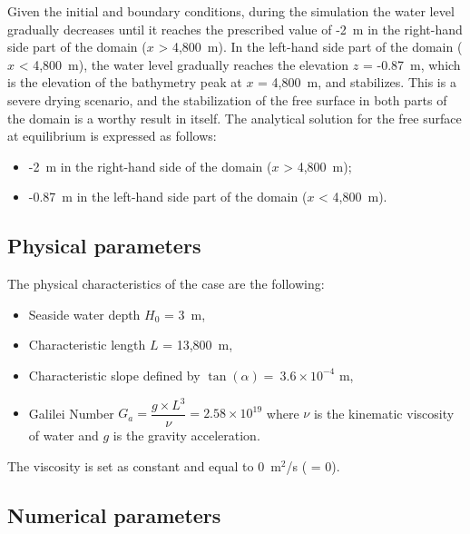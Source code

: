 Given the initial and boundary conditions, during the simulation
the water level gradually decreases until it reaches the prescribed value of -2~m in the right-hand
side part of the domain ($x$ > 4,800~m). In the left-hand side
part of the domain ($x$ < 4,800~m), the water level gradually reaches the elevation $z$ = -0.87~m, which
is the elevation of the bathymetry peak at $x$ = 4,800~m, and stabilizes. This is a severe drying scenario,
and the stabilization of the free surface in both parts of the domain is a worthy result in itself.
The analytical solution for the free surface at equilibrium is expressed as follows:
\begin{itemize}
\item -2~m in the right-hand side of the domain ($x$ > 4,800~m);
\item -0.87~m in the left-hand side part of the domain ($x$ < 4,800~m).
\end{itemize}

\subsection{Physical parameters}

The physical characteristics of the case are the following:
\begin{itemize}
  \itemsep0em
\item Seaside water depth $H_0$ = 3~m,
\item Characteristic length $L$ = 13,800~m,
\item Characteristic slope defined by $\tan(\alpha) = ~3.6 \times 10^{-4}$ m,
\item Galilei Number \textbf{$G_a = \dfrac{g \times L^3}{\nu} =  2.58 \times 10^{19}$}
  where $\nu$ is the kinematic viscosity of water and $g$ is the gravity acceleration.
\end{itemize}

The viscosity is set as constant and equal to 0~m$^2$/s ( = 0).

\subsection{Numerical parameters}

